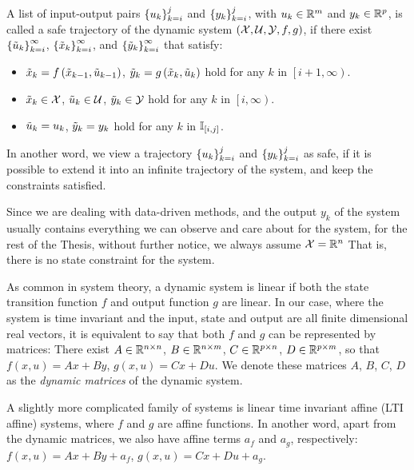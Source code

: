 \begin{definition}\label{def:dafe-traj}
    A list of input-output pairs $\left\{u_k\right\}_{k=i}^{j}$ and $\left\{y_k\right\}_{k=i}^{j}$, with $u_k \in \mathbb{R}^m$ and $y_k \in \mathbb{R}^p$, is called a safe trajectory of the dynamic system $\left(\mathcal{X}, \mathcal{U}, \mathcal{Y}, f, g\right)$, if there exist $\left\{\tilde{u}_k\right\}_{k=i}^{\infty}$, $\left\{\tilde{x}_k\right\}_{k=i}^{\infty}$, and $\left\{\tilde{y}_k\right\}_{k=i}^{\infty}$ that satisfy:

    \begin{itemize}
        \item $\tilde{x}_k = f\left(\tilde{x}_{k-1}, \tilde{u}_{k-1}\right)$, $\tilde{y}_k = g\left(\tilde{x}_k, \tilde{u}_k\right)$ hold for any $k$ in $\left[i+1, \infty\right)$.
        \item $\tilde{x}_k \in \mathcal{X}$, $\tilde{u}_k \in \mathcal{U}$, $\tilde{y}_k \in \mathcal{Y}$ hold for any $k$ in $\left[i, \infty\right)$.
        \item $\tilde{u}_k = u_k$, $\tilde{y}_k = y_k$ hold for any $k$ in $\mathbb{I}_{\left[ i, j \right]}$.
    \end{itemize}

\end{definition}

In another word, we view a trajectory $\left\{u_k\right\}_{k=i}^{j}$ and $\left\{y_k\right\}_{k=i}^{j}$ as safe, if it is possible to extend it
into an infinite trajectory of the system, and keep the constraints satisfied.

Since we are dealing with data-driven methods, and the output $y_k$ of the system usually contains everything we can observe and care about for the system, for the rest of the Thesis, without further notice, we always assume $\mathcal{X} = \mathbb{R}^n$
That is, there is no state constraint for the system.

As common in system theory, a dynamic system is linear if both the state transition function $f$ and output function $g$ are linear.
In our case, where the system is time invariant and the input, state and output are all finite dimensional real vectors, it is equivalent to say that both $f$ and $g$ can be represented by matrices:
There exist $A \in \mathbb{R}^{n \times n}$, $B \in \mathbb{R}^{n \times m}$, $C \in \mathbb{R}^{p \times n}$, $D \in \mathbb{R}^{p \times m}$, so that $f\left(x,u\right) = A x + B y$, $g\left(x, u\right) = C x + D u$.
We denote these matrices $A$, $B$, $C$, $D$ as the \emph{dynamic matrices} of the dynamic system.

A slightly more complicated family of systems is linear time invariant affine (LTI affine) systems, where $f$ and $g$ are affine functions.
In another word, apart from the dynamic matrices, we also have affine terms $a_f$ and $a_g$, respectively:
$f\left(x,u\right) = A x + B y + a_f$, $g\left(x, u\right) = C x + D u + a_g$.

